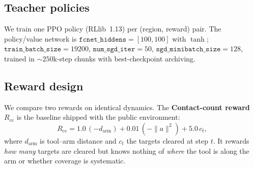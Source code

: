 \documentclass[conference]{IEEEtran}
\newcommand{\Rcc}{R_{\mathrm{cc}}}
\begin{document}
\subsection{Teacher policies}
We train one PPO policy (RLlib~1.13) per (region, reward) pair. The policy/value network is
$\texttt{fcnet\_hiddens}{=}[100,100]$ with $\tanh$;
$\texttt{train\_batch\_size}{=}19200$, $\texttt{num\_sgd\_iter}{=}50$,
$\texttt{sgd\_minibatch\_size}{=}128$, trained in ${\sim}250$k-step chunks with
best-checkpoint archiving.

\subsection{Reward design}
\label{sec:reward}
We compare two rewards on identical dynamics. The \textbf{Contact-count reward} $\Rcc$ is the
baseline shipped with the public environment:
\begin{equation}
\Rcc = 1.0\,(-d_{\text{arm}}) + 0.01\,(-\lVert a\rVert^2) + 5.0\,c_t,
\label{eq:cc}
\end{equation}
where $d_{\text{arm}}$ is tool--arm distance and $c_t$ the targets cleared at step $t$. It
rewards \emph{how many} targets are cleared but knows nothing of \emph{where} the tool is along
the arm or whether coverage is systematic.
\end{document}
